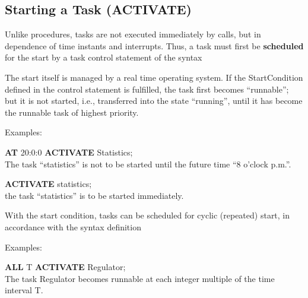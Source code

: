 \subsection{Starting a Task (ACTIVATE)}   %
\label{sec_task_activate}

Unlike procedures, tasks are not executed immediately by calls, but in
dependence of time instants and interrupts. Thus, a task must first be
{\bf scheduled} for the start by a task control statement of the
syntax



The start itself is managed by a real time operating system. If
the StartCondition defined in the control statement is fulfilled,
the task first becomes ``runnable''; but it is not started, i.e.,
transferred into the state ``running'', until it has become the runnable
task of highest priority. %

Examples:

{\bf AT} 20:0:0 {\bf ACTIVATE} Statistics;\\
The task ``statistics'' is not to be started until the
future time ``8 o'clock p.m.''.

{\bf ACTIVATE} statistics;\\
the task ``statistics'' is to be started immediately.

With the start condition, tasks can be scheduled for cyclic (repeated)
start, in accordance with the syntax definition





Examples:

{\bf ALL} T {\bf ACTIVATE} Regulator;\\
The task Regulator becomes runnable at each integer
multiple of the time interval T.

